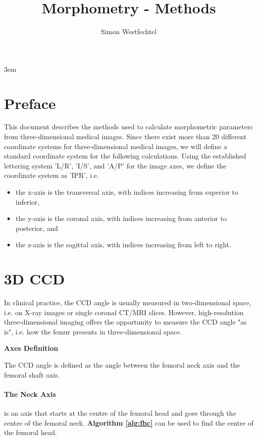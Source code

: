 \documentclass[a4paper,12pt]{article}
\title{Morphometry - Methods}
\author{Simon Westfechtel}
\newcommand{\subheading}[1]{\bigskip \large \noindent \textbf{#1}\bigskip \normalsize}
\begin{document}
	\emergencystretch 3em
	\maketitle

	\section*{Preface}
	\label{sec:preface}
	This document describes the methods used to calculate morphometric parameters from three-dimensional medical images.
	Since there exist more than 20 different coordinate systems for three-dimensional medical images, we will define a standard coordinate system for the following calculations.
	Using the established lettering system 'L/R', 'I/S', and 'A/P' for the image axes, we define the coordinate system as 'IPR', i.e.
	\begin{itemize}
		\item the x-axis is the transversal axis, with indices increasing from superior to inferior,
		\item the y-axis is the coronal axis, with indices increasing from anterior to posterior, and
		\item the z-axis is the sagittal axis, with indices increasing from left to right.
	\end{itemize}

	\section{3D CCD}
	\label{sec:ccd}
	In clinical practice, the CCD angle is usually measured in two-dimensional space, i.e. on X-ray images or single coronal CT/MRI slices.
	However, high-resolution three-dimensional imaging offers the opportunity to measure the CCD angle "as is", i.e. how the femur presents in three-dimensional space.

	\subheading{Axes Definition}

	\noindent The CCD angle is defined as the angle between the femoral neck axis and the femoral shaft axis.

	\paragraph{The Neck Axis}
	is an axis that starts at the centre of the femoral head and goes through the centre of the femoral neck.
	\textbf{Algorithm \ref{alg:fhc}} can be used to find the centre of the femoral head.
\end{document}
